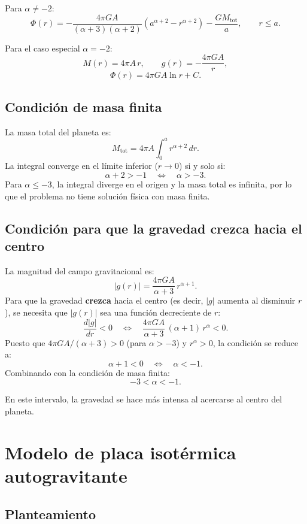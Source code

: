 Para $\alpha \neq -2$:
$$
\boxed{\Phi(r) = -\frac{4\pi GA}{(\alpha+3)(\alpha+2)}\left(a^{\alpha+2} - r^{\alpha+2}\right) - \frac{GM_{\text{tot}}}{a}, \qquad r \leq a.}
$$

Para el caso especial $\alpha = -2$:
$$
M(r) = 4\pi A\,r, \qquad g(r) = -\frac{4\pi GA}{r},
$$
$$
\Phi(r) = 4\pi GA\ln r + C.
$$

\subsection{Condición de masa finita}

La masa total del planeta es:
$$
M_{\text{tot}} = 4\pi A\int_0^a r^{\alpha+2}\,dr.
$$
La integral converge en el límite inferior ($r \to 0$) si y solo si:
$$
\alpha + 2 > -1 \quad \Longleftrightarrow \quad \boxed{\alpha > -3.}
$$
Para $\alpha \leq -3$, la integral diverge en el origen y la masa total es infinita, por lo que el problema no tiene solución física con masa finita.

\subsection{Condición para que la gravedad crezca hacia el centro}

La magnitud del campo gravitacional es:
$$
|g(r)| = \frac{4\pi GA}{\alpha + 3}\,r^{\alpha+1}.
$$
Para que la gravedad \textbf{crezca} hacia el centro (es decir, $|g|$ aumenta al disminuir $r$), se necesita que $|g(r)|$ sea una función decreciente de $r$:
$$
\frac{d|g|}{dr} < 0 \quad \Longleftrightarrow \quad \frac{4\pi GA}{\alpha+3}\,(\alpha+1)\,r^{\alpha} < 0.
$$
Puesto que $4\pi GA/(\alpha+3) > 0$ (para $\alpha > -3$) y $r^{\alpha} > 0$, la condición se reduce a:
$$
\alpha + 1 < 0 \quad \Longleftrightarrow \quad \boxed{\alpha < -1.}
$$
Combinando con la condición de masa finita:
$$
\boxed{-3 < \alpha < -1.}
$$

En este intervalo, la gravedad se hace más intensa al acercarse al centro del planeta.

\section{Modelo de placa isotérmica autogravitante}

\subsection{Planteamiento}

